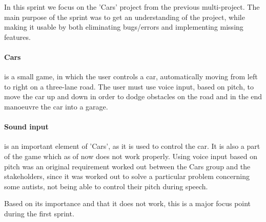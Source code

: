 In this sprint we focus on the 'Cars' project from the previous multi-project.
The main purpose of the sprint was to get an understanding of the project, while making it usable by both eliminating bugs/errors and implementing missing features.

\paragraph{Cars} is a small game, in which the user controls a car, automatically moving from left to right on a three-lane road.
The user must use voice input, based on pitch, to move the car up and down in order to dodge obstacles on the road and in the end manoeuvre the car into a garage.

\paragraph{Sound input} is an important element of 'Cars', as it is used to control the car.
It is also a part of the game which as of now does not work properly.
Using voice input based on pitch was an original requirement worked out between the Cars group and the stakeholders, since it was worked out to solve a particular problem concerning some autists, not being able to control their pitch during speech.

Based on its importance and that it does not work, this is a major focus point during the first sprint.